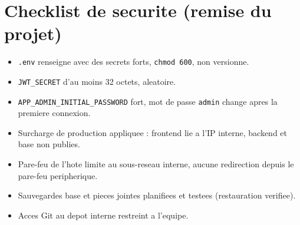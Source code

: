 \documentclass[11pt]{article}
\begin{document}
\section{Checklist de securite (remise du projet)}
\begin{srmok}
\begin{itemize}
  \item[$\square$] \texttt{.env} renseigne avec des secrets forts, \texttt{chmod 600}, non versionne.
  \item[$\square$] \texttt{JWT\_SECRET} d'au moins 32 octets, aleatoire.
  \item[$\square$] \texttt{APP\_ADMIN\_INITIAL\_PASSWORD} fort, mot de passe \texttt{admin} change apres la premiere connexion.
  \item[$\square$] Surcharge de production appliquee : frontend lie a l'IP interne, backend et base non publies.
  \item[$\square$] Pare-feu de l'hote limite au sous-reseau interne, aucune redirection depuis le pare-feu peripherique.
  \item[$\square$] Sauvegardes base et pieces jointes planifiees et testees (restauration verifiee).
  \item[$\square$] Acces Git au depot interne restreint a l'equipe.
\end{itemize}
\end{srmok}
\end{document}
